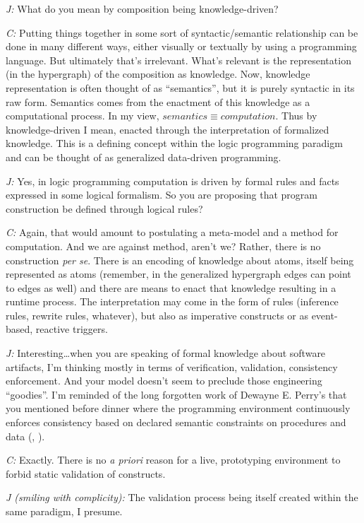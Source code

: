\documentclass[10pt]{sigplanconf}
\begin{document}
\emph{J:} What do you mean by composition being knowledge-driven?

\emph{C:} Putting things together in some sort of syntactic/semantic relationship can be done in many different ways, either visually or textually by using a programming language. But ultimately that's irrelevant. What's relevant is the representation (in the hypergraph) of the composition as knowledge. Now, knowledge representation is often thought of as ``semantics'', but it is purely syntactic in its raw form. Semantics comes from the enactment of this knowledge as a computational process. In my view,  $semantics\equiv computation$. Thus by knowledge-driven I mean, enacted through the interpretation of formalized knowledge. This is a defining concept within the logic programming paradigm and can be thought of as generalized data-driven programming.

\emph{J:} Yes, in logic programming computation is driven by formal rules and facts expressed in some logical formalism. So you are proposing that program construction be defined through logical rules?

\emph{C:} Again, that would amount to postulating a meta-model and a method for computation. And we are against method, aren't we? Rather, there is no construction \emph{per se}. There is an encoding of knowledge about atoms, itself being represented as atoms (remember, in the generalized hypergraph edges can point to edges as well) and there are means to enact that knowledge resulting in a runtime process. The interpretation may come in the form of rules (inference rules, rewrite rules, whatever), but also as imperative constructs or as event-based, reactive triggers.

\emph{J:} Interesting\ldots when you are speaking of formal knowledge about software artifacts, I'm thinking mostly in terms of verification, validation, consistency enforcement. And your model doesn't seem to preclude those engineering ``goodies''. I'm reminded of the long forgotten work of Dewayne E. Perry's that you mentioned before dinner where the programming environment continuously enforces consistency based on declared semantic constraints on procedures and data (\cite{perry2}, \cite{perry3}).

\emph{C:} Exactly. There is no \emph{a priori} reason for a live, prototyping environment to forbid static validation of constructs.

\emph{J (smiling with complicity):} The validation process being itself created within the same paradigm, I presume.
\end{document}
